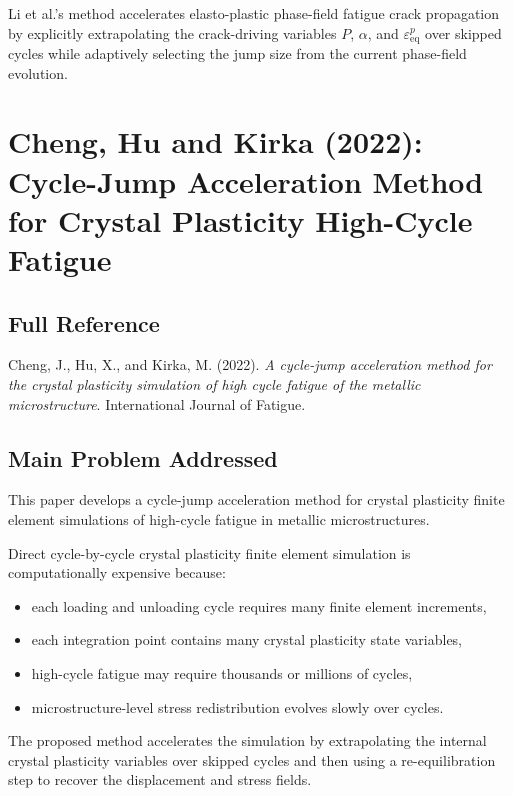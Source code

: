 ﻿\documentclass[11pt,a4paper]{article}
\begin{document}
Li et al.'s method accelerates elasto-plastic phase-field fatigue crack propagation by explicitly extrapolating the crack-driving variables $P$, $\alpha$, and $\varepsilon_{\mathrm{eq}}^p$ over skipped cycles while adaptively selecting the jump size from the current phase-field evolution.

\section{Cheng, Hu and Kirka (2022): Cycle-Jump Acceleration Method for Crystal Plasticity High-Cycle Fatigue}

\subsection{Full Reference}

Cheng, J., Hu, X., and Kirka, M. (2022).
\textit{A cycle-jump acceleration method for the crystal plasticity simulation of high cycle fatigue of the metallic microstructure}.
International Journal of Fatigue.

\subsection{Main Problem Addressed}

This paper develops a cycle-jump acceleration method for crystal plasticity finite element simulations of high-cycle fatigue in metallic microstructures.

Direct cycle-by-cycle crystal plasticity finite element simulation is computationally expensive because:

\begin{itemize}[leftmargin=*]
    \item each loading and unloading cycle requires many finite element increments,
    \item each integration point contains many crystal plasticity state variables,
    \item high-cycle fatigue may require thousands or millions of cycles,
    \item microstructure-level stress redistribution evolves slowly over cycles.
\end{itemize}

The proposed method accelerates the simulation by extrapolating the internal crystal plasticity variables over skipped cycles and then using a re-equilibration step to recover the displacement and stress fields.
\end{document}
